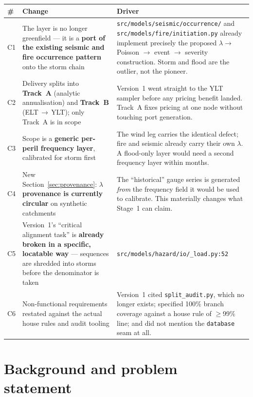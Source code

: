 \documentclass[11pt]{article}
\begin{document}
\begin{longtable}{@{}p{}p{}p{}@{}}
\toprule
\textbf{\#} & \textbf{Change} & \textbf{Driver} \\
\midrule
\endhead
C1 & The layer is no longer greenfield --- it is a \textbf{port of the existing
seismic and fire occurrence pattern} onto the storm chain &
\texttt{src/models/seismic/occurrence/} and \texttt{src/models/fire/initiation.py}
already implement precisely the proposed $\lambda \rightarrow$ Poisson $\rightarrow$
event $\rightarrow$ severity construction. Storm and flood are the outlier, not
the pioneer. \\
\addlinespace
C2 & Delivery splits into \textbf{Track~A} (analytic annualisation) and
\textbf{Track~B} (ELT\,$\rightarrow$\,YLT); only Track~A is in scope &
Version~1 went straight to the YLT sampler before any pricing benefit landed.
Track~A fixes pricing at one node without touching port generation. \\
\addlinespace
C3 & Scope is a \textbf{generic per-peril frequency layer}, calibrated for storm
first & The wind leg carries the identical defect; fire and seismic already
carry their own $\lambda$. A flood-only layer would need a second frequency
layer within months. \\
\addlinespace
C4 & New Section~\ref{sec:provenance}: \textbf{$\lambda$ provenance is currently
circular} on synthetic catchments & The ``historical'' gauge series is generated
\emph{from} the frequency field it would be used to calibrate. This materially
changes what Stage~1 can claim. \\
\addlinespace
C5 & Version~1's ``critical alignment task'' is \textbf{already broken in a
specific, locatable way} --- sequences are shredded into storms before the
denominator is taken & \texttt{src/models/hazard/io/\_load.py:52} \\
\addlinespace
C6 & Non-functional requirements restated against the actual house rules and
audit tooling & Version~1 cited \texttt{split\_audit.py}, which no longer exists;
specified 100\% branch coverage against a house rule of $\geq$99\% line; and did
not mention the \texttt{database} seam at all. \\
\bottomrule
\end{longtable}

\section{Background and problem statement}
\end{document}
